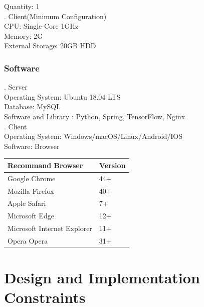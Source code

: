 \documentclass[16pt]{scrreprt}
\begin{document}
 
Quantity: 1\\

 
. Client(Minimum Configuration)\\

 
CPU: Single-Core 1GHz\\

 
Memory: 2G\\

 
External Storage: 20GB HDD\\

 
\subsubsection{Software}

 
. Server\\

 
Operating System: Ubuntu 18.04 LTS\\

 
Database: MySQL\\

 
Software and Library : Python, Spring, TensorFlow, Nginx\\

 
. Client\\

 
Operating System: Windows/macOS/Linux/Android/IOS\\

 
Software: Browser\\

 
\begin{center}
    \begin{tabular}{p{7cm}p{7cm}}
        \hline
        Recommand Browser & Version\\
        \hline
        Google Chrome &  44+\\
        \hline
        Mozilla Firefox & 40+\\
        \hline
        Apple Safari & 7+\\
        \hline
        Microsoft Edge & 12+\\
        \hline
        Microsoft Internet Explorer & 11+\\
        \hline
        Opera Opera & 31+\\
        \hline

 
    \end{tabular}
\end{center}

 
\section{Design and Implementation Constraints}
\end{document}
